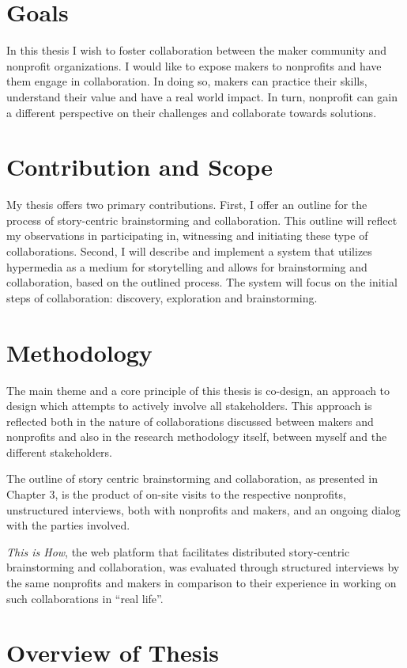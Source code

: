 \section{Goals}
In this thesis I wish to foster collaboration between the maker community and nonprofit organizations. I would like to expose makers to nonprofits and have them engage in collaboration. In doing so, makers can practice their skills, understand their value and have a real world impact. In turn, nonprofit can gain a different perspective on their challenges and collaborate towards solutions. 

\section{Contribution and Scope}
My thesis offers two primary contributions. First, I offer an outline for the process of story-centric brainstorming and collaboration. This outline will reflect my observations in participating in, witnessing and initiating these type of collaborations. Second, I will describe and implement a system that utilizes hypermedia as a medium for storytelling and allows for brainstorming and collaboration, based on the outlined process. The system will focus on the initial steps of collaboration: discovery, exploration and brainstorming. 

\section{Methodology} 
The main theme and a core principle of this thesis is co-design, an approach to design which attempts to actively involve all stakeholders. This approach is reflected both in the nature of collaborations discussed between makers and nonprofits and also in the research methodology itself, between myself and the different stakeholders. 

The outline of story centric brainstorming and collaboration, as presented in Chapter 3, is the product of on-site visits to the respective nonprofits, unstructured interviews, both with nonprofits and makers, and an ongoing dialog with the parties involved. 

\textit{This is How}, the web platform that facilitates distributed story-centric brainstorming and collaboration, was evaluated through structured interviews by the same nonprofits and makers in comparison to their experience in working on such collaborations in ``real life''. 

\section{Overview of Thesis}

